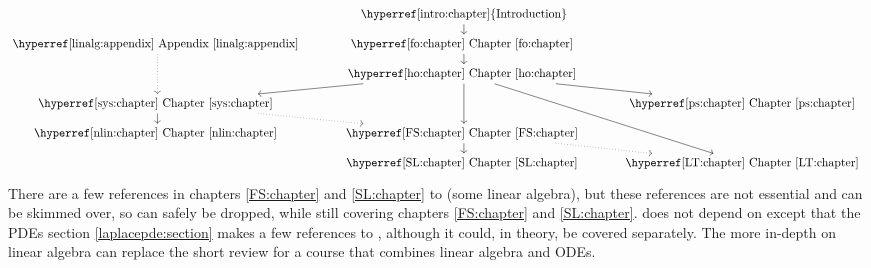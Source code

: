 \begin{equation*}
\begin{tikzcd}[cramped, row sep=small]
& {\text{\hyperref[intro:chapter]{Introduction}}} \arrow[d] \\
{\text{\Appendixref{linalg:appendix}}} \arrow[dd, dotted]
& {\text{\Chapterref{fo:chapter}}} \arrow[d] \\
& {\text{\Chapterref{ho:chapter}}} \arrow[dddr] \arrow[dd] \arrow[dl] \arrow[dr] \\
{\text{\Chapterref{sys:chapter}}} \arrow[dr, dotted] \arrow[d] & &
  {\text{\Chapterref{ps:chapter}}} \\
{\text{\Chapterref{nlin:chapter}}} & {\text{\Chapterref{FS:chapter}}} \arrow[d]
\arrow[dr,dotted] \\
& {\text{\Chapterref{SL:chapter}}}
& {\text{\Chapterref{LT:chapter}}}
\end{tikzcd}
\end{equation*}

There are a few references in chapters \ref{FS:chapter} and \ref{SL:chapter}
to  (some linear algebra), but these
references are not essential and can be skimmed over,
so 
can safely be dropped, while still covering
chapters \ref{FS:chapter} and \ref{SL:chapter}.
 does not depend on
 except that the
PDEs section \ref{laplacepde:section} makes a
few references to
,
although it could, in theory, be covered
separately.
The more in-depth  on linear algebra
can replace the short review 
for a course that combines linear algebra and ODEs.

